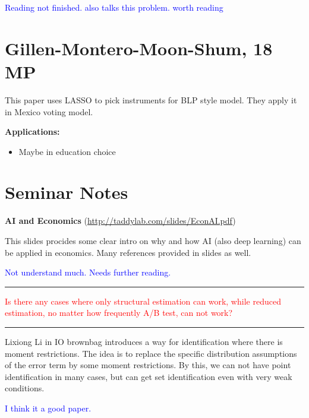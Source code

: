 \documentclass{book}
\theoremstyle{plain}
\theoremstyle{definition}
\newcommand{\myline}{\vspace{3mm} \hrule \vspace{4mm}}
\begin{document}
\textcolor{blue}{Reading not finished.
\cite{grimmer_stewart_2013} also talks this problem. worth reading}


\section{Gillen-Montero-Moon-Shum, 18 MP} %
\label{sec:gillen_montero_moon_shum_18mp}

\noindent
\textbf{}

This paper uses LASSO to pick instruments for BLP style model. They apply it in Mexico voting model.

\vspace{1em}
\noindent
\textbf{Applications:}
\begin{itemize}
	\item Maybe in education choice
\end{itemize}



\section{Seminar Notes} %
\label{sec:seminar_notes}

\noindent
\textbf{AI and Economics}
(\url{http://taddylab.com/slides/EconAI.pdf})

This slides procides some clear intro on why and how AI (also deep learning) can be applied in economics.
Many references provided in slides as well.

\textcolor{blue}{Not understand much. Needs further reading.}

\myline

\textcolor{red}{Is there any cases where only structural estimation can work, while reduced estimation, no matter how frequently A/B test, can not work?}



\myline

Lixiong Li in IO brownbag introduces a way for identification where there is moment restrictions.
The idea is to replace the specific distribution assumptions of the error term by some moment restrictions.
By this, we can not have point identification in many cases, but can get set identification even with very weak conditions.

\textcolor{blue}{I think it a good paper.}

\end{document}
